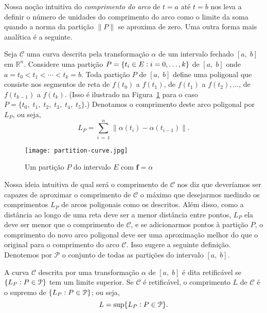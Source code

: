 Nossa noção intuitiva do \emph{comprimento do arco} de \(t = a\) até \(t = b\) nos leva a definir o número de unidades do comprimento do arco como o limite da soma quando a norma da partição \(\|{P}\|\) se aproxima de zero.  Uma outra forma mais analítica é a seguinte.

Seja \(\mathcal{C}\) uma curva descrita pela transformação \(\alpha\) de um intervalo fechado 
\([a,\; b]\) em \(\mathbb{R}^{n}\). Considere uma partição \(P =\{t_{i} \in E\vcentcolon i = 0,\ldots, 
k \}\) de \([a, \; b]\) onde \(a = t_{0} < t_{1} <\cdots < t_{k}= b\). Toda partição \(P\) de 
\([a,\; b]\) define uma poligonal  que consiste nos segmentos de reta de \(f(t_{0})\) a \(f(t_{1})\), de \(f(t_{1})\) a \(f(t_{2}),\ldots\), de \(f(t_{k-1})\) a \(f(t_{k})\). (Isso é ilustrado na Figura~\ref{fig:10-1} para o caso \(P=\{t_{0},\; t_{1},\; t_{2},\; t_{3},\; t_{4},\; t_{5}\}\).) Denotamos o  comprimento deste arco poligonal por \(L_{P}\), ou seja,
\begin{equation*}
L_{P} = \sum_{i\,=\, 1}^{n}\|\alpha(t_{i})- \alpha(t_{i-1})\|.
\end{equation*}
\begin{figure}[H]
\centering
\texttt{[image: partition-curve.jpg]}
\caption{Um partição \(P\) do intervalo \(E\) com \(\boldsymbol{f}=\alpha\)}
\label{fig:10-1}
\end{figure}

Nossa ideia intuitiva de qual será o comprimento de \(\mathcal{C}\) nos diz que deveríamos ser
capazes de aproximar o comprimento de \(\mathcal{C}\) o máximo que desejarmos medindo os 
comprimentos \(L_{P}\) de arcos poligonais como os descritos. Além disso, como a distância ao 
longo de uma reta deve ser a  menor distância entre pontos, \(L_{P}\) ela deve ser menor que o 
comprimento de \(\mathcal{C}\), e se adicionarmos  pontos à partição \(P\), o comprimento do novo 
arco poligonal deve ser uma aproximação melhor do que  o original para o comprimento do arco 
\(\mathcal{C}\). Isso sugere a seguinte definição. Denotemos por \(\mathcal{P}\) o  conjunto de todas as partições do intervalo \([a,\; b]\).

\begin{defi}
A curva \(\mathcal{C}\) descrita por uma transformação \(\alpha\) de \([a, \; b]\) é dita 
retificável se \(\{L_{P} \vcentcolon P \in \mathcal{P}\}\) tem um limite superior. Se \(\mathcal{C}\) é retificável, o comprimento \(L\) de \(\mathcal{C}\) é o 
supremo de \(\{L_{P} \vcentcolon P \in \mathcal{P}\}\); ou seja,
\begin{equation*}
 L = \sup \{L_{P} \vcentcolon P \in \mathcal{P}\}.
\end{equation*}
\end{defi}	

